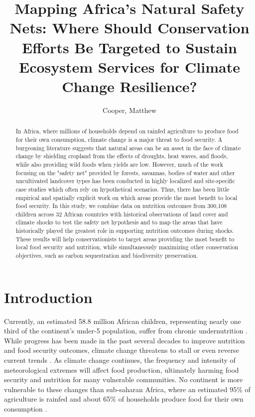 \documentclass{article}
\begin{document}
\title{Mapping Africa's Natural Safety Nets: Where Should Conservation Efforts Be Targeted to Sustain Ecosystem Services for Climate Change Resilience?}

\author{
	Cooper, Matthew\\
}

\maketitle
\begin{abstract}

In Africa, where millions of households depend on rainfed agriculture to produce food for their own consumption, climate change is a major threat to food security.  A burgeoning literature suggests that natural areas can be an asset in the face of climate change by shielding cropland from the effects of droughts, heat waves, and floods, while also providing wild foods when yields are low.  However, much of the work focusing on the "safety net" provided by forests, savannas, bodies of water and other uncultivated landcover types has been conducted in highly localized and site-specific case studies which often rely on hypothetical scenarios.  Thus, there has been little empirical and spatially explicit work on which areas provide the most benefit to local food security.  In this study, we combine data on nutrition outcomes from  300,108 children across 32 African countries with historical observations of land cover and climate shocks to test the safety net hypothesis and to map the areas that have historically played the greatest role in supporting nutrition outcomes during shocks.  These results will help conservationists to target areas providing the most benefit to local food security and nutrition, while simultaneously maximizing other conservation objectives, such as carbon sequestration and biodiversity preservation.

\end{abstract}

\section{Introduction}

Currently, an estimated 58.8 million African children, representing nearly one third of the continent's under-5 population, suffer from chronic undernutrition \cite{unicef2019}.  While progress has been made in the past several decades to improve nutrition and food security outcomes, climate change threatens to stall or even reverse current trends \cite{FAO2018}.  As climate change continues, the frequency and intensity of meteorological extremes will affect food production, ultimately harming food security and nutrition for many vulnerable communities.  No continent is more vulnerable to these changes than sub-saharan Africa, where an estimated 95\% of agriculture is rainfed \cite{Wani2009} and about 65\% of households  produce food for their own consumption \cite{Runge2004}.
\end{document}
